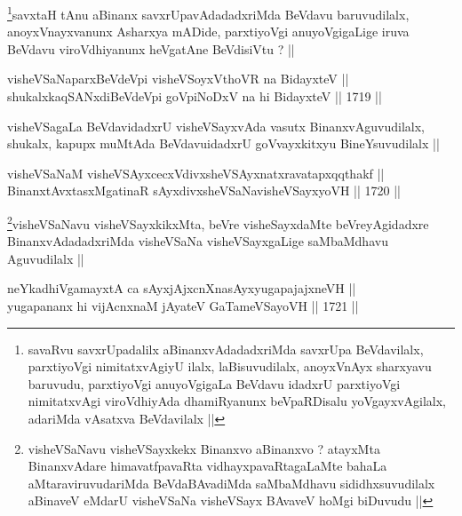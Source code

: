 \begin{artha}
\footnote[2]{savaRvu savxrUpadalilx aBinanxvAdadadxriMda savxrUpa
  BeVdavilalx, parxtiyoVgi nimitatxvAgiyU ilalx, laBisuvudilalx,
  anoyxVnAyx sharxyavu baruvudu, parxtiyoVgi anuyoVgigaLa BeVdavu
  idadxrU parxtiyoVgi nimitatxvAgi viroVdhiyAda dhamiRyanunx
  beVpaRDisalu yoVgayxvAgilalx, adariMda vAsatxva BeVdavilalx ||}savxtaH tAnu aBinanx savxrUpavAdadadxriMda BeVdavu baruvudilalx,
anoyxVnayxvanunx Asharxya mADide, parxtiyoVgi anuyoVgigaLige iruva
BeVdavu viroVdhiyanunx heVgatAne BeVdisiVtu ? ||
\end{artha}


\begin{shl}
visheVSaNaparxBeVdeV\s pi visheVSoyxV\s thoVR na BidayxteV || \\
shukalxkaqSANxdiBeVdeV\s pi goVpiNoDxV na hi BidayxteV ||  1719 ||  
\end{shl}

\begin{artha}
visheVSagaLa BeVdavidadxrU visheVSayxvAda vasutx BinanxvAguvudilalx,
shukalx, kapupx muMtAda BeVdavuidadxrU goVvayxkitxyu BineYsuvudilalx ||
\end{artha}


\begin{shl}
visheVSaNaM visheVSAyxcecxVdivxsheVSAyxnatxravatapxqqthakf || \\
BinanxtAvxtasxMgatinaR sAyxdivxsheVSaNavisheVSayxyoVH ||  1720 ||  
\end{shl}

\begin{artha}
\footnote[1]{visheVSaNavu visheVSayxkekx Binanxvo aBinanxvo ? atayxMta
BinanxvAdare himavatfpavaRta vidhayxpavaRtagaLaMte bahaLa
aMtaraviruvudariMda BeVdaBAvadiMda saMbaMdhavu sididhxsuvudilalx
aBinaveV eMdarU visheVSaNa visheVSayx BAvaveV hoMgi biDuvudu ||}visheVSaNavu visheVSayxkikxMta, beVre visheSayxdaMte
beVreyAgidadxre BinanxvAdadadxriMda visheVSaNa visheVSayxgaLige
saMbaMdhavu Aguvudilalx ||
\end{artha}


\begin{shl}
neYkadhiVgamayxtA ca sAyxjAjxcnXnasAyxyugapajajxneVH || \\
yugapananx hi vijAcnxnaM jAyateV GaTameVSayoVH ||  1721 ||  
\end{shl}

